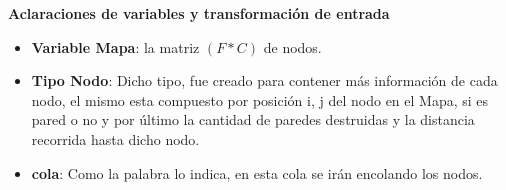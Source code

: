 \begin{algorithm}[H] %
\end{algorithm}


\begin{algorithm}[H] %

\end{algorithm}


\textbf{Aclaraciones de variables y transformaci\'on de entrada}

\begin{itemize}
\item {\bf Variable Mapa}: la matriz $(F \ast C)$ de nodos.
\item {\bf Tipo Nodo}: Dicho tipo, fue creado para contener m\'as informaci\'on de cada nodo, el mismo esta compuesto por posici\'on i, j del nodo en el Mapa, si es pared o no y por \'ultimo la cantidad de paredes destruidas y la distancia recorrida hasta dicho nodo.
\item {\bf cola}: Como la palabra lo indica, en esta cola se ir\'an encolando los nodos.
\end{itemize}  



